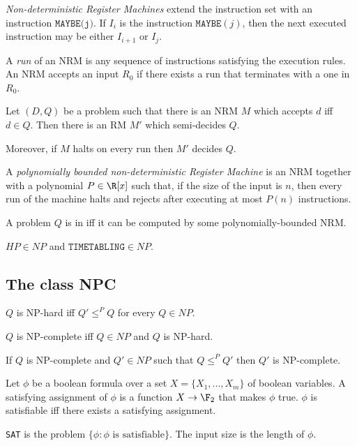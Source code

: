 \documentclass{article}
\begin{document}
\begin{definition*}[NRM]
	\emph{Non-deterministic Register Machines} extend the instruction set with an instruction
	$\texttt{MAYBE(j)}$. If $I_i$ is the instruction $\texttt{MAYBE}(j)$, then the next executed instruction
	may be either $I_{i+1}$ or $I_j$.

	A \emph{run} of an NRM is any sequence of instructions satisfying the execution rules. An NRM accepts
	an input $R_0$ if there exists a run that terminates with a one in $R_0$.
\end{definition*}

\begin{theorem*}[Notes II.10]
	Let $(D,Q)$ be a problem such that there is an NRM $M$ which accepts $d$ iff $d\in Q$.
	Then there is an RM $M'$ which semi-decides $Q$.

	Moreover, if $M$ halts on every run then $M'$ decides $Q$.
\end{theorem*}

\begin{definition*}[NP]
	A \emph{polynomially bounded non-deterministic Register Machine} is an NRM together with a polynomial
	$P\in\R[x]$ such that, if the size of the input is $n$, then every run of the machine halts and
	rejects after executing at most $P(n)$ instructions.

	A problem $Q$ is in \nptime iff it can be computed by some polynomially-bounded NRM.
\end{definition*}

\begin{theorem*}[Notes II.12]
	$HP\in NP$ and $\texttt{TIMETABLING}\in NP$.
\end{theorem*}

\subsection{The class NPC}

\begin{definition*}
	$Q$ is NP-hard iff $Q'\leq^P Q$ for every $Q\in NP$.

	$Q$ is NP-complete iff $Q\in NP$ and $Q$ is NP-hard.
\end{definition*}

\begin{theorem*}[II.15]
	If $Q$ is NP-complete and $Q'\in NP$ such that $Q\leq^P Q'$
	then $Q'$ is NP-complete.
\end{theorem*}

\begin{definition*}[SAT]
	Let $\phi$ be a boolean formula over a set $X=\{X_1, ..., X_m\}$ of 
	boolean variables. A satisfying assignment of $\phi$ is a function
	$X\to\F_2$ that makes $\phi$ true. $\phi$ is satisfiable iff
	there exists a satisfying assignment.

	\texttt{SAT} is the problem $\{\phi : \phi \text{ is satisfiable}\}$.
	The input size is the length of $\phi$.	
\end{definition*}
\end{document}
